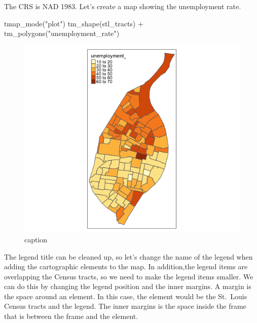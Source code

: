 \documentclass[
  krantz2]{krantz}
\makeatletter
\newenvironment{Shaded}{\begin{snugshade}}{\end{snugshade}}
\newcommand{\FunctionTok}[1]{\textcolor[rgb]{0,0,0}{#1}}
\newcommand{\NormalTok}[1]{#1}
\newcommand{\SpecialCharTok}[1]{\textcolor[rgb]{0,0,0}{#1}}
\newcommand{\StringTok}[1]{\textcolor[rgb]{0.5,0.5,0.5}{#1}}
\newenvironment{kframe}{%
\medskip{}
\setlength{\fboxsep}{.8em}
 \def\at@end@of@kframe{}%
 \ifinner\ifhmode%
  \def\at@end@of@kframe{\end{minipage}}%
  \begin{minipage}{\columnwidth}%
 \fi\fi%
 \def\FrameCommand##1{\hskip\@totalleftmargin \hskip-\fboxsep
 \colorbox{shadecolor}{##1}\hskip-\fboxsep
     \hskip-\linewidth \hskip-\@totalleftmargin \hskip\columnwidth}%
 \MakeFramed {\advance\hsize-\width
   \@totalleftmargin\z@ \linewidth\hsize
   \@setminipage}}%
 {\par\unskip\endMakeFramed%
 \at@end@of@kframe}
\renewenvironment{Shaded}{\begin{kframe}}{\end{kframe}}
\makeatother
\begin{document}
The CRS is NAD 1983. Let's create a map showing the unemployment rate.

\begin{Shaded}
\begin{Highlighting}[]
\FunctionTok{tmap\_mode}\NormalTok{(}\StringTok{"plot"}\NormalTok{)}
\FunctionTok{tm\_shape}\NormalTok{(stl\_tracts) }\SpecialCharTok{+}
  \FunctionTok{tm\_polygons}\NormalTok{(}\StringTok{"unemployment\_rate"}\NormalTok{)}
\end{Highlighting}
\end{Shaded}

\begin{figure}
\centering
\includegraphics{tmap-images/code-5.png}
\caption{caption}
\end{figure}

The legend title can be cleaned up, so let's change the name of the legend when adding the cartographic elements to the map. In addition,the legend items are overlapping the Census tracts, so we need to make the legend items smaller. We can do this by changing the legend position and the inner margins. A margin is the space around an element. In this case, the element would be the St.~Louis Census tracts and the legend. The inner margins is the space inside the frame that is between the frame and the element.
\end{document}

